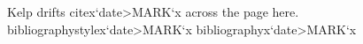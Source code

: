 \documentclass{article}
\begin{document}
Kelp drifts \csname citex`date>MARK`x across the page here.
\csname bibliographystylex`date>MARK`x
\csname bibliographyx`date>MARK`x
\end{document}
